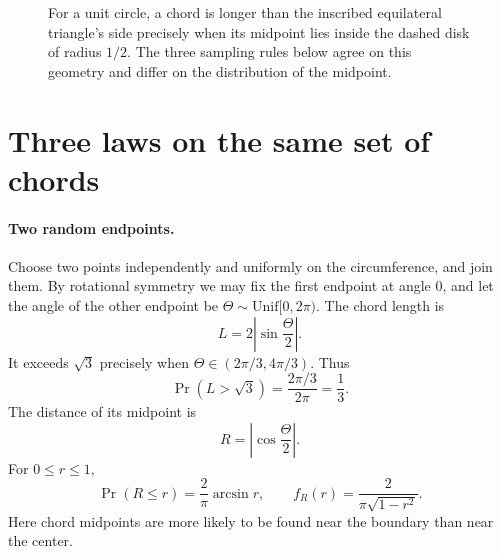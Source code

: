 \begin{figure}[htbp]
\centering
{}
\caption{For a unit circle, a chord is longer than the inscribed equilateral triangle's side precisely when its midpoint lies inside the dashed disk of radius \(1/2\). The three sampling rules below agree on this geometry and differ on the distribution of the midpoint.}
\label{fig:N20261105-chord}
\end{figure}

\section{Three laws on the same set of chords}

\paragraph{Two random endpoints.}
Choose two points independently and uniformly on the circumference, and join them. By rotational symmetry we may fix the first endpoint at angle \(0\), and let the angle of the other endpoint be \(\Theta\sim\mathrm{Unif}[0,2\pi)\). The chord length is
\[
 L=2\left|\sin\frac{\Theta}{2}\right|.
\]
It exceeds \(\sqrt3\) precisely when
\(\Theta\in(2\pi/3,4\pi/3)\). Thus
\[
 \boxed{\Pr(L>\sqrt3)=\frac{2\pi/3}{2\pi}=\frac13.}
\]
The distance of its midpoint is
\[
 R=\left|\cos\frac{\Theta}{2}\right|.
\]
For \(0\leq r\leq1\),
\[
 \Pr(R\leq r)=\frac{2}{\pi}\arcsin r,\qquad
 f_R(r)=\frac{2}{\pi\sqrt{1-r^2}}.
\]
Here chord midpoints are more likely to be found near the boundary than near the center.

